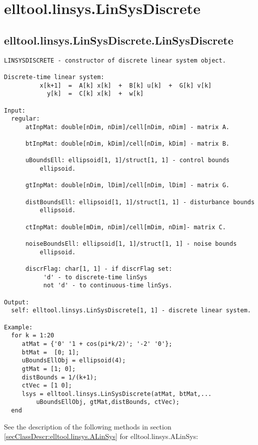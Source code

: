 \section{elltool.linsys.LinSysDiscrete}\label{secClassDescr:elltool.linsys.LinSysDiscrete}
\subsection{\texorpdfstring{elltool.linsys.LinSysDiscrete.LinSysDiscrete}{LinSysDiscrete}}\label{method:elltool.linsys.LinSysDiscrete.LinSysDiscrete}
\begin{verbatim}
LINSYSDISCRETE - constructor of discrete linear system object.

Discrete-time linear system:
          x[k+1]  =  A[k] x[k]  +  B[k] u[k]  +  G[k] v[k]
            y[k]  =  C[k] x[k]  +  w[k]

Input:
  regular:
      atInpMat: double[nDim, nDim]/cell[nDim, nDim] - matrix A.

      btInpMat: double[nDim, kDim]/cell[nDim, kDim] - matrix B.

      uBoundsEll: ellipsoid[1, 1]/struct[1, 1] - control bounds
          ellipsoid.

      gtInpMat: double[nDim, lDim]/cell[nDim, lDim] - matrix G.

      distBoundsEll: ellipsoid[1, 1]/struct[1, 1] - disturbance bounds
          ellipsoid.

      ctInpMat: double[mDim, nDim]/cell[mDim, nDim]- matrix C.

      noiseBoundsEll: ellipsoid[1, 1]/struct[1, 1] - noise bounds
          ellipsoid.

      discrFlag: char[1, 1] - if discrFlag set:
           'd' - to discrete-time linSys
           not 'd' - to continuous-time linSys.

Output:
  self: elltool.linsys.LinSysDiscrete[1, 1] - discrete linear system.

Example:
  for k = 1:20
     atMat = {'0' '1 + cos(pi*k/2)'; '-2' '0'};
     btMat =  [0; 1];
     uBoundsEllObj = ellipsoid(4);
     gtMat = [1; 0];
     distBounds = 1/(k+1);
     ctVec = [1 0];
     lsys = elltool.linsys.LinSysDiscrete(atMat, btMat,...
         uBoundsEllObj, gtMat,distBounds, ctVec);
  end
\end{verbatim}


See the description of the following methods in section \ref{secClassDescr:elltool.linsys.ALinSys}
 for elltool.linsys.ALinSys:

